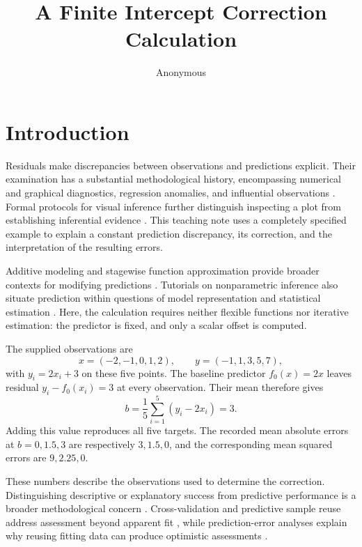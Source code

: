 \documentclass[11pt]{article}
\title{A Finite Intercept Correction Calculation}
\author{Anonymous}
\date{}
\begin{document}
\maketitle
\begin{abstract}
\end{abstract}
\section{Introduction}

Residuals make discrepancies between observations and predictions explicit. Their examination has a substantial methodological history, encompassing numerical and graphical diagnostics, regression anomalies, and influential observations \cite{Anscombe1963ExaminationAnalysis,Denby1987ExampleUse,Chatterjee1986InfluentialObservations,Cook1977DetectionInfluential}. Formal protocols for visual inference further distinguish inspecting a plot from establishing inferential evidence \cite{Buja2009StatisticalInference}. This teaching note uses a completely specified example to explain a constant prediction discrepancy, its correction, and the interpretation of the resulting errors.

Additive modeling and stagewise function approximation provide broader contexts for modifying predictions \cite{Hastie1986GeneralizedAdditive,Friedman2001GreedyFunction}. Tutorials on nonparametric inference also situate prediction within questions of model representation and statistical estimation \cite{Geman1992NeuralNetworks}. Here, the calculation requires neither flexible functions nor iterative estimation: the predictor is fixed, and only a scalar offset is computed.

The supplied observations are
\[
x=(-2,-1,0,1,2), \qquad y=(-1,1,3,5,7),
\]
with $y_i=2x_i+3$ on these five points. The baseline predictor $f_0(x)=2x$ leaves residual $y_i-f_0(x_i)=3$ at every observation. Their mean therefore gives
\[
b=\frac{1}{5}\sum_{i=1}^{5}(y_i-2x_i)=3.
\]
Adding this value reproduces all five targets. The recorded mean absolute errors at $b=0,1.5,3$ are respectively $3,1.5,0$, and the corresponding mean squared errors are $9,2.25,0$.

These numbers describe the observations used to determine the correction. Distinguishing descriptive or explanatory success from predictive performance is a broader methodological concern \cite{Shmueli2010ExplainOr,Yarkoni2017ChoosingPrediction}. Cross-validation and predictive sample reuse address assessment beyond apparent fit \cite{Stone1974CrossvalidatoryChoice,Geisser1975PredictiveSample,Arlot2010SurveyCrossvalidation}, while prediction-error analyses explain why reusing fitting data can produce optimistic assessments \cite{Efron1986HowBiased,Efron2004EstimationPrediction}.
\end{document}
